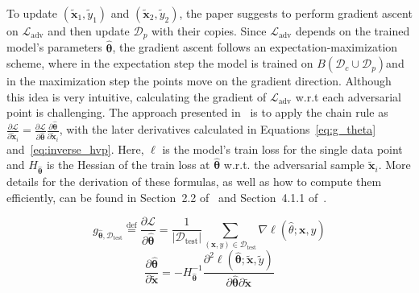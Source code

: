 To update $(\tilde{\mathbf{x}}_1, \tilde{y}_1)$ and $(\tilde{\mathbf{x}}_2, \tilde{y}_2)$, the paper suggests to perform gradient ascent on $\mathcal{L}_{\mathrm{adv}}$ and then update $\mathcal{D}_p$ with their copies. Since $\mathcal{L}_{\mathrm{adv}}$ depends on the trained model's parameters $\hat{\boldsymbol{\theta}}$, the gradient ascent follows an expectation-maximization scheme, where in the expectation step the model is trained on $B(\mathcal{D}_c \cup \mathcal{D}_p)$\footnotemark and in the maximization step the points move on the gradient direction. Although this idea is very intuitive, calculating the gradient of $\mathcal{L}_{\mathrm{adv}}$ w.r.t each adversarial point is challenging. The approach presented in~\cite{koh2018} is to apply the chain rule as $\frac{\partial \mathcal{L}}{\partial \tilde{\mathbf{x}}_i} = \frac{\partial \mathcal{L}}{\partial \hat{\boldsymbol{\theta}}} \frac{\partial \hat{\boldsymbol{\theta}}}{\partial \tilde{\mathbf{x}}_i}$, with the later derivatives calculated in Equations~\ref{eq:g_theta} and~\ref{eq:inverse_hvp}. Here, $\ell$ is the model's train loss for the single data point and $H_{\hat{\boldsymbol{\theta}}}$ is the Hessian of the train loss at $\hat{\boldsymbol{\theta}}$ w.r.t. the adversarial sample $\tilde{\mathbf{x}}_i$. More details for the derivation of these formulas, as well as how to compute them efficiently, can be found in Section~2.2 of~\cite{koh2017} and Section~4.1.1 of~\cite{koh2018}.


\begin{equation}
    g_{\hat{\boldsymbol{\theta}}, \mathcal{D}_{\text{test}}} \overset{\operatorname{def}}{=}
    \dfrac{\partial \mathcal{L}}{\partial \hat{\boldsymbol{\theta}}} =
    \dfrac{1}{| \mathcal{D}_\text{test} |}
    \sum_{(\mathbf{x},y) \in \mathcal{D}_\text{test}} \nabla \ell(\hat{\theta}; \mathbf{x},y)
    \label{eq:g_theta}
\end{equation}
\begin{equation}
    \dfrac{\partial \hat{\boldsymbol{\theta}}}{\partial \tilde{\mathbf{x}}} =
    - H_{\hat{\boldsymbol{\theta}}}^{-1}
    \dfrac{\partial^2 \ell(\hat{\boldsymbol{\theta}};\tilde{\mathbf{x}}, \tilde{y})}{\partial \hat{\boldsymbol{\theta}} \partial \tilde{\mathbf{x}}}
    \label{eq:inverse_hvp}
\end{equation}

